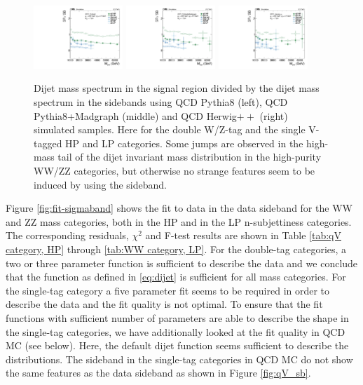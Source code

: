 \begin{figure}[h!]
\centering
\includegraphics[width=0.3\textwidth]{figures/analysis/search2/AN-16-235/plots/MjjSRvsSB_pythia8.pdf}
\includegraphics[width=0.3\textwidth]{figures/analysis/search2/AN-16-235/plots/MjjSRvsSB_pythia8Madgraph.pdf}
\includegraphics[width=0.3\textwidth]{figures/analysis/search2/AN-16-235/plots/MjjSRvsSB_herwig.pdf}
\caption{Dijet mass spectrum in the signal region divided by the dijet mass spectrum in the sidebands using QCD Pythia8 (left), QCD Pythia8+Madgraph (middle) and QCD Herwig$++$ (right) simulated samples. Here for the double W/Z-tag and the single V-tagged HP and LP categories. Some jumps are observed in the high-mass tail of the dijet invariant mass distribution in the high-purity WW/ZZ categories, but otherwise no strange features seem to be induced by using the sideband. }
\label{fig:NPVVvsCat}
\end{figure}

Figure \ref{fig:fit-sigmaband} shows the fit to data in the data sideband for the WW and ZZ  mass categories, both in the HP and in the LP n-subjettiness categories. The corresponding residuals, $\chi^2$ and F-test results are shown in Table \ref{tab:qV category, HP} through \ref{tab:WW category, LP}. For the double-tag categories, a two or three parameter function is sufficient to describe the data and we conclude that the function as defined in \ref{eq:dijet} is sufficient for all mass categories. For the single-tag category a five parameter fit seems to be required in order to describe the data and the fit quality is not optimal. To ensure that the fit functions with sufficient number of parameters are able to describe the shape in the single-tag categories, we have additionally looked at the fit quality in QCD MC (see below). Here, the default dijet function seems sufficient to describe the distributions. The sideband in the single-tag categories in QCD MC do not show the same features as the data sideband as shown in Figure \ref{fig:qV_sb}.

